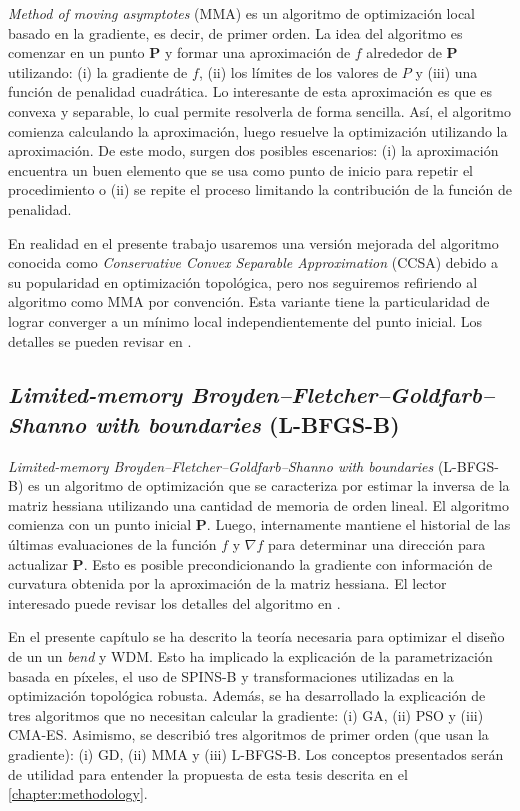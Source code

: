 \emph{Method of moving asymptotes} (MMA) es un algoritmo de optimización
local basado en la gradiente, es decir, de primer orden.
La idea del algoritmo es comenzar en un punto $\boldsymbol{P}$ y formar
una aproximación de $f$ alrededor de $\boldsymbol{P}$ utilizando:
(i) la gradiente de $f$,
(ii) los límites de los valores de $P$ y
(iii) una función de penalidad cuadrática.
Lo interesante de esta aproximación es que es convexa y separable, lo cual permite
resolverla de forma sencilla.
Así, el algoritmo comienza calculando la aproximación, luego resuelve la optimización
utilizando la aproximación.
De este modo, surgen dos posibles escenarios:
(i) la aproximación encuentra un buen elemento que se usa como punto de inicio para repetir el procedimiento o
(ii) se repite el proceso limitando la contribución de la función de penalidad.

En realidad en el presente trabajo usaremos una versión mejorada del algoritmo
conocida como \emph{Conservative Convex Separable Approximation} (CCSA) 
debido a su popularidad en optimización topológica, pero nos seguiremos refiriendo
al algoritmo como MMA por convención.
Esta variante tiene la particularidad de lograr converger a un mínimo local independientemente
del punto inicial. Los detalles se pueden revisar en \cite{Svanberg2002}.

\subsection{\emph{Limited-memory Broyden–Fletcher–Goldfarb–Shanno with boundaries} (L-BFGS-B)}\label{sec:lbfgsb}

\emph{Limited-memory Broyden–Fletcher–Goldfarb–Shanno with boundaries} (L-BFGS-B) es un algoritmo
de optimización que se caracteriza por estimar la inversa de la matriz hessiana utilizando 
una cantidad de memoria de orden lineal.
El algoritmo comienza con un punto inicial $\boldsymbol{P}$.
Luego, internamente mantiene el historial de las últimas evaluaciones de la función $f$ y $\nabla f$
para determinar una dirección para actualizar $\boldsymbol{P}$.
Esto es posible precondicionando la gradiente con información de curvatura obtenida por
la aproximación de la matriz hessiana.
El lector interesado puede revisar los detalles del algoritmo en \cite{Liu1989}.


En el presente capítulo se ha descrito la teoría necesaria para optimizar el diseño de un
un \emph{bend} y WDM.
Esto ha implicado la explicación de la parametrización basada en píxeles,
el uso de SPINS-B y transformaciones utilizadas en la optimización topológica robusta.
Además, se ha desarrollado la explicación de tres algoritmos que no necesitan calcular la gradiente:
(i) GA, (ii) PSO y (iii) CMA-ES. Asimismo, se describió tres algoritmos de primer orden 
(que usan la gradiente): (i) GD, (ii) MMA y (iii) L-BFGS-B.
Los conceptos presentados serán de utilidad para entender la propuesta de esta tesis descrita en el
\autoref{chapter:methodology}.


